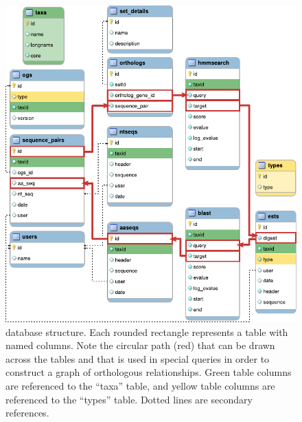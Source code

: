 \begin{figure}[h!]
	\centering
	\includegraphics[width=\textwidth]{img/dbstructure.pdf}
	\caption[Complete \pname database structure]{
		\pname database structure. Each rounded rectangle represents a table with
		named columns. Note the circular path (red) that can be drawn across the
		tables and that is used in special  queries in order to construct
		a graph of orthologous relationships. Green table columns are referenced to
		the ``taxa'' table, and yellow table columns are referenced to the ``types''
		table. Dotted lines are secondary references.
	}
	\label{fig:dbstructure}
\end{figure}



